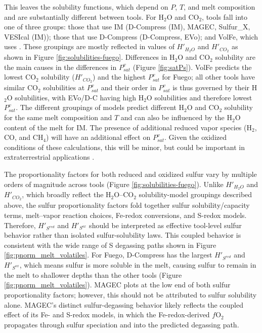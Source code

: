 \documentclass[draft, english]{volcanica-template}
\begin{document}
This leaves the solubility functions, which depend on $P$, $T$, and melt composition and are substantially different between tools. For H$_2$O and CO$_2$, tools fall into one of three groups: those that use IM (D-Compress (IM), MAGEC, Sulfur\_X, VESIcal (IM)); those that use D-Compress (D-Compress, EVo); and VolFe, which uses \textcite{hughes2024modeling}. These groupings are mostly reflected in values of $H'_{H_2O}$ and $H'_{CO_2}$ as shown in Figure \ref{fig:solubilities-fuego}. Differences in H$_2$O and CO$_2$ solubility are the main causes in the differences in $P^v_{sat}$ (Figure \ref{fig:satPs}). VolFe predicts the lowest CO$_2$ solubility ($H'_{CO_2}$) and the highest $P^v_{sat}$ for Fuego; all other tools have similar CO$_2$ solubilities at $P^v_{sat}$ and their order in $P^v_{sat}$ is thus governed by their H$_2$O solubilities, with EVo/D-C having high H$_2$O solubilities and therefore lowest $P^v_{sat}$. The different groupings of models predict different H$_2$O and CO$_2$ solubility for the same melt composition and $T$ and can also be influenced by the H$_2$O content of the melt for IM. The presence of additional reduced vapor species (H$_2$, CO, and CH$_4$) will have an additional effect on $P^v_{sat}$. Given the oxidized conditions of these calculations, this will be minor, but could be important in extraterrestrial applications \parencite{hughes2024}.

The proportionality factors for both reduced and oxidized sulfur vary by multiple orders of magnitude across tools (Figure \ref{fig:solubilities-fuego}). Unlike $H'_{H_2O}$ and $H'_{CO_2}$, which broadly reflect the H$_2$O--CO$_2$ solubility-model groupings described above, the sulfur proportionality factors fold together sulfur solubility/capacity terms, melt--vapor reaction choices, Fe-redox conversions, and S-redox models. Therefore, $H'_{S^{red}}$ and $H'_{S^{ox}}$ should be interpreted as effective tool-level sulfur behavior rather than isolated sulfur-solubility laws. This coupled behavior is consistent with the wide range of S degassing paths shown in Figure \ref{fig:pnorm_melt_volatiles}. For Fuego, D-Compress has the largest $H'_{S^{red}}$ and $H'_{S^{ox}}$, which means sulfur is more soluble in the melt, causing sulfur to remain in the melt to shallower depths than the other tools (Figure \ref{fig:pnorm_melt_volatiles}). MAGEC plots at the low end of both sulfur proportionality factors; however, this should not be attributed to sulfur solubility alone. MAGEC's distinct sulfur-degassing behavior likely reflects the coupled effect of its Fe- and S-redox models, in which the Fe-redox-derived $f$O$_2$ propagates through sulfur speciation and into the predicted degassing path.
\end{document}
